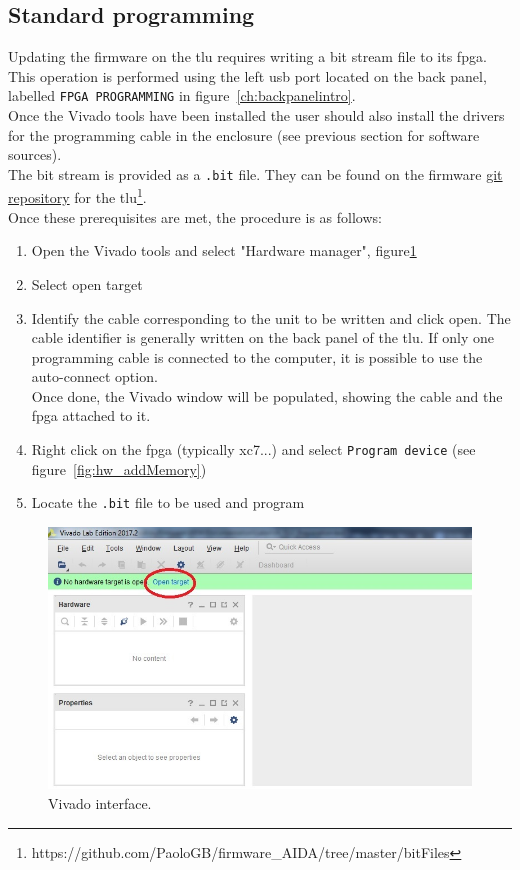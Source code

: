 \subsection{Standard programming}\label{ch:flashFPGA}
Updating the firmware on the \gls{tlu} requires writing a bit stream file to its \gls{fpga}.
This operation is performed using the left \gls{usb} port located on the back panel, labelled \verb"FPGA PROGRAMMING" in figure~\ref{ch:backpanelintro}.\\
Once the Vivado tools have been installed the user should also install the drivers for the programming cable in the enclosure (see previous section for software sources).\\
The bit stream is provided as a \verb".bit" file. They can be found on the firmware \href{https://github.com/PaoloGB/firmware_AIDA/tree/master/bitFiles}{git repository} for the \gls{tlu}\footnote{https://github.com/PaoloGB/firmware\_AIDA/tree/master/bitFiles}.\\
Once these prerequisites are met, the procedure is as follows:
\begin{enumerate}
  \item Open the Vivado tools and select "Hardware manager", figure\ref{fig:hw_open}
  \item Select open target
  \item Identify the cable corresponding to the unit to be written and click open. The cable identifier is generally written on the back panel of the \gls{tlu}. If only one programming cable is connected to the computer, it is possible to use the auto-connect option.\\
      Once done, the Vivado window will be populated, showing the cable and the \gls{fpga} attached to it.
  \item Right click on the \gls{fpga} (typically xc7...) and select \verb"Program device" (see figure~\ref{fig:hw_addMemory})
  \item Locate the \verb".bit" file to be used and program
  \end{enumerate}
\begin{figure}
  \centering
  \includegraphics[width=.80\textwidth]{./Images/hw_open.jpg}
  \caption{Vivado interface.}\label{fig:hw_open}
\end{figure}
